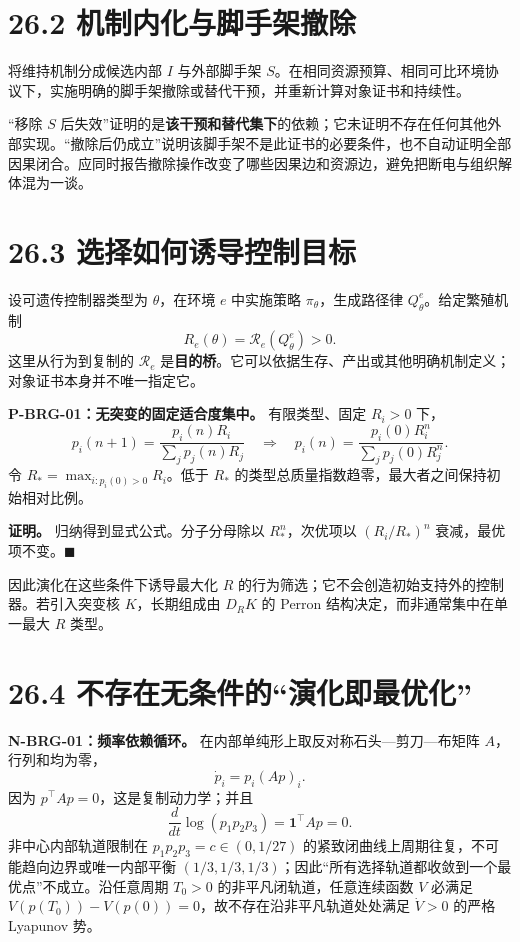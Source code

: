 \documentclass[
  11pt,
  oneside]{book}
\begin{document}
\section{26.2 机制内化与脚手架撤除}\label{ux673aux5236ux5185ux5316ux4e0eux811aux624bux67b6ux64a4ux9664}

将维持机制分成候选内部 \(I\) 与外部脚手架 \(S\)。在相同资源预算、相同可比环境协议下，实施明确的脚手架撤除或替代干预，并重新计算对象证书和持续性。

``移除 \(S\) 后失效''证明的是\textbf{该干预和替代集下}的依赖；它未证明不存在任何其他外部实现。``撤除后仍成立''说明该脚手架不是此证书的必要条件，也不自动证明全部因果闭合。应同时报告撤除操作改变了哪些因果边和资源边，避免把断电与组织解体混为一谈。

\section{26.3 选择如何诱导控制目标}\label{ux9009ux62e9ux5982ux4f55ux8bf1ux5bfcux63a7ux5236ux76eeux6807}

设可遗传控制器类型为 \(\theta\)，在环境 \(e\) 中实施策略 \(\pi_\theta\)，生成路径律 \(Q_\theta^e\)。给定繁殖机制 \[R_e(\theta)=\mathcal R_e(Q_\theta^e)>0.\] 这里从行为到复制的 \(\mathcal R_e\) 是\textbf{目的桥}。它可以依据生存、产出或其他明确机制定义；对象证书本身并不唯一指定它。

\hypertarget{p-brg-01}{}\label{p-brg-01}

\textbf{P-BRG-01：无突变的固定适合度集中。} 有限类型、固定 \(R_i>0\) 下， \[p_i(n+1)=\frac{p_i(n)R_i}{\sum_jp_j(n)R_j}
\quad\Longrightarrow\quad
p_i(n)=\frac{p_i(0)R_i^n}{\sum_jp_j(0)R_j^n}.\] 令 \(R_*=\max_{i:p_i(0)>0}R_i\)。低于 \(R_*\) 的类型总质量指数趋零，最大者之间保持初始相对比例。

\textbf{证明。} 归纳得到显式公式。分子分母除以 \(R_*^n\)，次优项以 \((R_i/R_*)^n\) 衰减，最优项不变。\(\blacksquare\)

因此演化在这些条件下诱导最大化 \(R\) 的行为筛选；它不会创造初始支持外的控制器。若引入突变核 \(K\)，长期组成由 \(D_RK\) 的 Perron 结构决定，而非通常集中在单一最大 \(R\) 类型。

\section{26.4 不存在无条件的``演化即最优化''}\label{ux4e0dux5b58ux5728ux65e0ux6761ux4ef6ux7684ux6f14ux5316ux5373ux6700ux4f18ux5316}

\textbf{N-BRG-01：频率依赖循环。} 在内部单纯形上取反对称石头---剪刀---布矩阵 \(A\)，行列和均为零， \[\dot p_i=p_i(Ap)_i.\] 因为 \(p^\top Ap=0\)，这是复制动力学；并且 \[\frac{d}{dt}\log(p_1p_2p_3)=\mathbf1^\top Ap=0.\] 非中心内部轨道限制在 \(p_1p_2p_3=c\in(0,1/27)\) 的紧致闭曲线上周期往复，不可能趋向边界或唯一内部平衡 \((1/3,1/3,1/3)\)；因此``所有选择轨道都收敛到一个最优点''不成立。沿任意周期 \(T_0>0\) 的非平凡闭轨道，任意连续函数 \(V\) 必满足 \(V(p(T_0))-V(p(0))=0\)，故不存在沿非平凡轨道处处满足 \(\dot V>0\) 的严格 Lyapunov 势。
\end{document}
